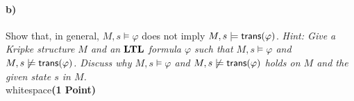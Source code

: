 \paragraph{b)} Show that, in general, $M, s \models \varphi$ does not imply $M, s \models \mathsf{trans}(\varphi)$.
\emph{Hint: Give a Kripke structure $M$ and an $\mathbf{LTL}$ formula $\varphi$ such that $M, s \models \varphi$ and $M, s \not\models \mathsf{trans}(\varphi)$. Discuss why $M, s \models \varphi$ and $M, s \not\models \mathsf{trans}(\varphi)$ holds on $M$ and the given state $s$ in $M$.}\\{\color{white} whitespace}\hfill\textbf{(1 Point)}



